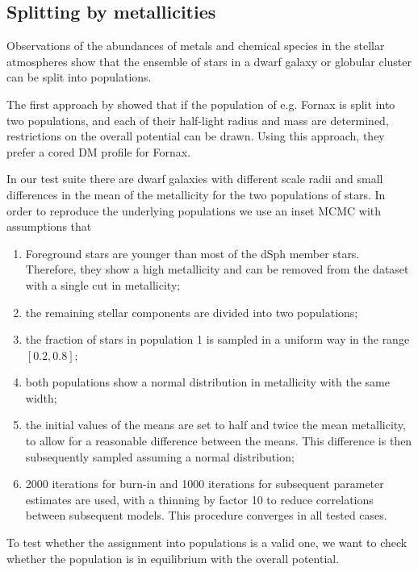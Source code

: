 \subsection{Splitting by metallicities}\label{sec:metals}

Observations of the abundances of metals and chemical species in the
stellar atmospheres show that the ensemble of stars in a dwarf galaxy
or globular cluster can be split into populations.

The first approach by \cite{WalkerPenarrubia2012} showed that if the
population of e.g. Fornax is split into two populations, and each of
their half-light radius and mass are determined, restrictions on the
overall potential can be drawn. Using this approach, they prefer a
cored DM profile for Fornax.

In our test suite there are dwarf galaxies with different scale radii
and small differences in the mean of the metallicity for the two
populations of stars. In order to reproduce the underlying populations
we use an inset MCMC with assumptions that

\begin{enumerate}
\item Foreground stars are younger than most of the dSph member
  stars. Therefore, they show a high metallicity and can be removed
  from the dataset with a single cut in metallicity;
\item the remaining stellar components are divided into two
  populations;
\item the fraction of stars in population 1 is sampled in a uniform
  way in the range $[0.2,0.8]$;
\item both populations show a normal distribution in metallicity with
  the same width;
\item the initial values of the means are set to half and twice the
  mean metallicity, to allow for a reasonable difference between the
  means. This difference is then subsequently sampled assuming a
  normal distribution;
\item 2000 iterations for burn-in and 1000 iterations for subsequent
  parameter estimates are used, with a thinning by factor 10 to reduce
  correlations between subsequent models. This procedure converges in
  all tested cases.
\end{enumerate}


To test whether the assignment into populations is a valid one, we
want to check whether the population is in equilibrium with the
overall potential.

